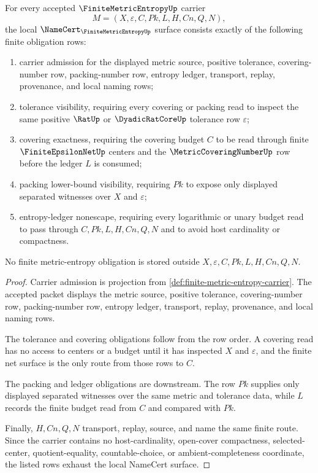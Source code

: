 \begin{theorem}
\label{thm:finite-metric-entropy-namecert-obligations}
For every accepted $\FiniteMetricEntropyUp$ carrier
$$
M=(X,\varepsilon,C,Pk,L,H,Cn,Q,N),
$$
the local $\NameCert_{\FiniteMetricEntropyUp}$ surface consists exactly of the following finite obligation rows:
\begin{enumerate}
\item carrier admission for the displayed metric source, positive tolerance, covering-number row, packing-number row, entropy ledger, transport, replay, provenance, and local naming rows;
\item tolerance visibility, requiring every covering or packing read to inspect the same positive $\RatUp$ or $\DyadicRatCoreUp$ tolerance row $\varepsilon$;
\item covering exactness, requiring the covering budget $C$ to be read through finite $\FiniteEpsilonNetUp$ centers and the $\MetricCoveringNumberUp$ row before the ledger $L$ is consumed;
\item packing lower-bound visibility, requiring $Pk$ to expose only displayed separated witnesses over $X$ and $\varepsilon$;
\item entropy-ledger nonescape, requiring every logarithmic or unary budget read to pass through $C,Pk,L,H,Cn,Q,N$ and to avoid host cardinality or compactness.
\end{enumerate}
No finite metric-entropy obligation is stored outside $X,\varepsilon,C,Pk,L,H,Cn,Q,N$.
\end{theorem}
\begin{proof}
Carrier admission is projection from \autoref{def:finite-metric-entropy-carrier}. The accepted packet displays the metric source, positive tolerance, covering-number row, packing-number row, entropy ledger, transport, replay, provenance, and local naming rows.

The tolerance and covering obligations follow from the row order. A covering read has no access to centers or a budget until it has inspected $X$ and $\varepsilon$, and the finite net surface is the only route from those rows to $C$.

The packing and ledger obligations are downstream. The row $Pk$ supplies only displayed separated witnesses over the same metric and tolerance data, while $L$ records the finite budget read from $C$ and compared with $Pk$.

Finally, $H,Cn,Q,N$ transport, replay, source, and name the same finite route. Since the carrier contains no host-cardinality, open-cover compactness, selected-center, quotient-equality, countable-choice, or ambient-completeness coordinate, the listed rows exhaust the local NameCert surface.
\end{proof}

